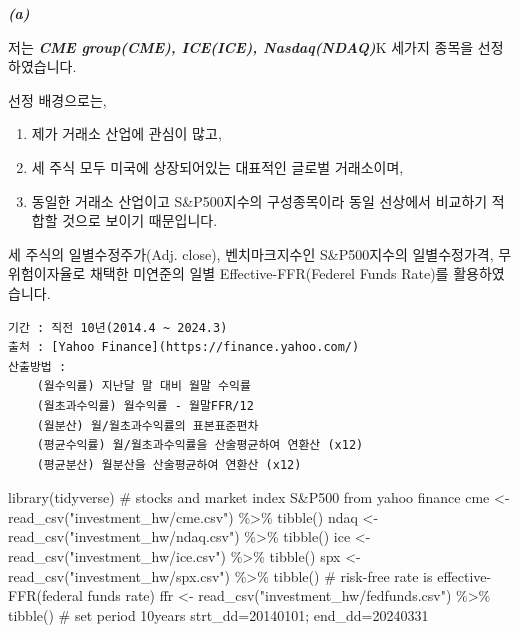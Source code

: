 \documentclass[
  a4paper,
  DIV=11,
  numbers=noendperiod]{scrreprt}
\newenvironment{Shaded}{\begin{snugshade}}{\end{snugshade}}
\newcommand{\CommentTok}[1]{\textcolor[rgb]{0.37,0.37,0.37}{#1}}
\newcommand{\FunctionTok}[1]{\textcolor[rgb]{0.28,0.35,0.67}{#1}}
\newcommand{\NormalTok}[1]{\textcolor[rgb]{0.00,0.23,0.31}{#1}}
\newcommand{\OtherTok}[1]{\textcolor[rgb]{0.00,0.23,0.31}{#1}}
\newcommand{\SpecialCharTok}[1]{\textcolor[rgb]{0.37,0.37,0.37}{#1}}
\newcommand{\StringTok}[1]{\textcolor[rgb]{0.13,0.47,0.30}{#1}}
\providecommand{\tightlist}{%
  \setlength{\itemsep}{0pt}\setlength{\parskip}{0pt}}\usepackage{longtable,booktabs,array}
\begin{document}

\textbf{\emph{(a)}}

저는 \textbf{\emph{CME group(CME), ICE(ICE), Nasdaq(NDAQ)}}K 세가지
종목을 선정하였습니다.

선정 배경으로는,

\begin{enumerate}
\def\labelenumi{(\arabic{enumi})}
\tightlist
\item
  제가 거래소 산업에 관심이 많고,
\item
  세 주식 모두 미국에 상장되어있는 대표적인 글로벌 거래소이며,
\item
  동일한 거래소 산업이고 S\&P500지수의 구성종목이라 동일 선상에서
  비교하기 적합할 것으로 보이기 때문입니다.
\end{enumerate}

세 주식의 일별수정주가(Adj. close), 벤치마크지수인 S\&P500지수의
일별수정가격, 무위험이자율로 채택한 미연준의 일별 Effective-FFR(Federel
Funds Rate)를 활용하였습니다.

\begin{verbatim}
기간 : 직전 10년(2014.4 ~ 2024.3)
출처 : [Yahoo Finance](https://finance.yahoo.com/)
산출방법 :
    (월수익률) 지난달 말 대비 월말 수익률
    (월초과수익률) 월수익률 - 월말FFR/12
    (월분산) 월/월초과수익률의 표본표준편차
    (평균수익률) 월/월초과수익률을 산술평균하여 연환산 (x12)
    (평균분산) 월분산을 산술평균하여 연환산 (x12)
\end{verbatim}

\begin{Shaded}
\begin{Highlighting}[]
\FunctionTok{library}\NormalTok{(tidyverse)}
\CommentTok{\# stocks and market index S\&P500 from yahoo finance}
\NormalTok{cme }\OtherTok{\textless{}{-}} \FunctionTok{read\_csv}\NormalTok{(}\StringTok{"investment\_hw/cme.csv"}\NormalTok{) }\SpecialCharTok{\%\textgreater{}\%} \FunctionTok{tibble}\NormalTok{()}
\NormalTok{ndaq }\OtherTok{\textless{}{-}} \FunctionTok{read\_csv}\NormalTok{(}\StringTok{"investment\_hw/ndaq.csv"}\NormalTok{) }\SpecialCharTok{\%\textgreater{}\%} \FunctionTok{tibble}\NormalTok{()}
\NormalTok{ice }\OtherTok{\textless{}{-}} \FunctionTok{read\_csv}\NormalTok{(}\StringTok{"investment\_hw/ice.csv"}\NormalTok{) }\SpecialCharTok{\%\textgreater{}\%} \FunctionTok{tibble}\NormalTok{()}
\NormalTok{spx }\OtherTok{\textless{}{-}} \FunctionTok{read\_csv}\NormalTok{(}\StringTok{"investment\_hw/spx.csv"}\NormalTok{) }\SpecialCharTok{\%\textgreater{}\%} \FunctionTok{tibble}\NormalTok{()}
\CommentTok{\# risk{-}free rate is effective{-}FFR(federal funds rate)}
\NormalTok{ffr }\OtherTok{\textless{}{-}} \FunctionTok{read\_csv}\NormalTok{(}\StringTok{"investment\_hw/fedfunds.csv"}\NormalTok{) }\SpecialCharTok{\%\textgreater{}\%} \FunctionTok{tibble}\NormalTok{()}
\CommentTok{\# set period 10years}
\NormalTok{strt\_dd}\OtherTok{=}\StringTok{\textquotesingle{}20140101\textquotesingle{}}\NormalTok{; end\_dd}\OtherTok{=}\StringTok{\textquotesingle{}20240331\textquotesingle{}}
\end{Highlighting}
\end{Shaded}
\end{document}
